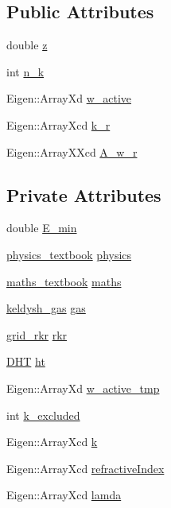 \subsection*{Public Attributes}
\begin{DoxyCompactItemize}
\item 
double \hyperlink{classpropagation_aeacfc091fafd1fdb1af4536f6f587e55}{z}
\item 
int \hyperlink{classpropagation_a93033ee98c04a6fe007eae5c856e76b3}{n\+\_\+k}
\item 
Eigen\+::\+Array\+Xd \hyperlink{classpropagation_a4c24f42d4148eded469c6479d6bf1661}{w\+\_\+active}
\item 
Eigen\+::\+Array\+Xcd \hyperlink{classpropagation_a9e437271e452fa1732f50e006347b501}{k\+\_\+r}
\item 
Eigen\+::\+Array\+X\+Xcd \hyperlink{classpropagation_ad3a84addde67e43bbb606408193f78ee}{A\+\_\+w\+\_\+r}
\end{DoxyCompactItemize}
\subsection*{Private Attributes}
\begin{DoxyCompactItemize}
\item 
double \hyperlink{classpropagation_ab5a753d760a135806a93b9082e8019fb}{E\+\_\+min}
\item 
\hyperlink{classphysics__textbook}{physics\+\_\+textbook} \hyperlink{classpropagation_a42a6e725e3dd53cf94192bf93c31c8de}{physics}
\item 
\hyperlink{classmaths__textbook}{maths\+\_\+textbook} \hyperlink{classpropagation_ab5a5024c2d06c0dad06c745af7c6416c}{maths}
\item 
\hyperlink{classkeldysh__gas}{keldysh\+\_\+gas} \hyperlink{classpropagation_a4152dc9a226a7ff91aff2338d0bd813f}{gas}
\item 
\hyperlink{classgrid__rkr}{grid\+\_\+rkr} \hyperlink{classpropagation_a3d37531bb5918f972544d242aec7e72b}{rkr}
\item 
\hyperlink{class_d_h_t}{D\+HT} \hyperlink{classpropagation_a044544975e7fc2ec3df9a55d92f8cc90}{ht}
\item 
Eigen\+::\+Array\+Xd \hyperlink{classpropagation_a07a80b67a345e3e9d8e934d2265ba288}{w\+\_\+active\+\_\+tmp}
\item 
int \hyperlink{classpropagation_a76f3651eac23a69c1259dc0406fbe0d9}{k\+\_\+excluded}
\item 
Eigen\+::\+Array\+Xcd \hyperlink{classpropagation_a49a30e941421cd5e3f0b62bd1335a767}{k}
\item 
Eigen\+::\+Array\+Xcd \hyperlink{classpropagation_aba601a0df3c63b13215c55d8ade2bcd7}{refractive\+Index}
\item 
Eigen\+::\+Array\+Xcd \hyperlink{classpropagation_a5ae0154dc8db04188ba92e10ba981000}{lamda}
\end{DoxyCompactItemize}


